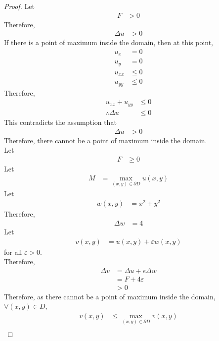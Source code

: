 \documentclass[titlepage, fleqn, a4paper, 12pt, twoside]{article}
\theoremstyle{definition}
\theoremstyle{theorem}
\begin{document}
\begin{proof}
	Let
	\begin{align*}
		F & > 0
	\end{align*}
	Therefore,
	\begin{align*}
		\Delta u & > 0
	\end{align*}
	If there is a point of maximum inside the domain, then at this point,
	\begin{align*}
		u_x     & = 0   \\
		u_y     & = 0   \\
		u_{x x} & \le 0 \\
		u_{y y} & \le 0
	\end{align*}
	Therefore,
	\begin{align*}
		u_{x x} + u_{y y}   & \le 0 \\
		\therefore \Delta u & \le 0
	\end{align*}
	This contradicts the assumption that
	\begin{align*}
		\Delta u & > 0
	\end{align*}
	Therefore, there cannot be a point of maximum inside the domain.\\
	Let
	\begin{align*}
		F & \ge 0
	\end{align*}
	Let
	\begin{align*}
		M & = \max\limits_{(x,y) \in \partial D} u(x,y)
	\end{align*}
	Let
	\begin{align*}
		w(x,y) & = x^2 + y^2
	\end{align*}
	Therefore,
	\begin{align*}
		\Delta w & = 4
	\end{align*}
	Let
	\begin{align*}
		v(x,y) & = u(x,y) + \varepsilon w(x,y)
	\end{align*}
	for all $\varepsilon > 0$.\\
	Therefore,
	\begin{align*}
		\Delta v & = \Delta u + e \Delta w \\
                         & = F + 4 \varepsilon     \\
                         & > 0
	\end{align*}
	Therefore, as there cannot be a point of maximum inside the domain, $\forall (x,y) \in D$,
	\begin{align*}
		v(x,y) & \le \max\limits_{(x,y) \in \partial D} v(x,y)                                             \\

\end{align*}
\end{proof}
\end{document}
